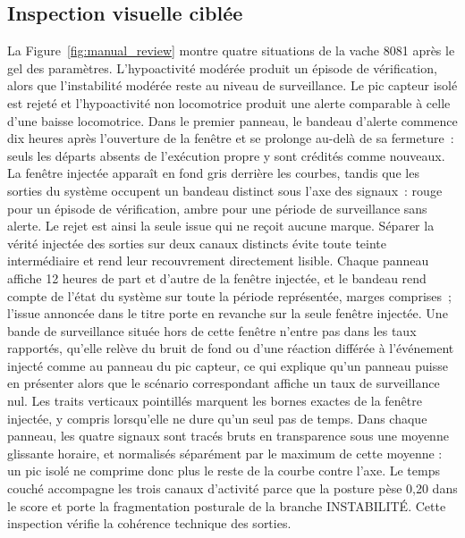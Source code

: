 \subsection{Inspection visuelle ciblée}
La Figure~\ref{fig:manual_review} montre quatre situations de la vache 8081 après le gel
des paramètres. L'hypoactivité modérée produit un épisode de vérification, alors que
l'instabilité modérée reste au niveau de surveillance. Le pic capteur isolé est rejeté et
l'hypoactivité non
locomotrice produit une alerte comparable à celle d'une baisse locomotrice. Dans le premier
panneau, le bandeau d'alerte commence dix heures après l'ouverture de la fenêtre et se
prolonge au-delà de sa fermeture~: seuls les départs absents de l'exécution propre y sont
crédités comme nouveaux. La fenêtre injectée
apparaît en fond gris derrière les courbes, tandis que les sorties du système occupent un
bandeau distinct sous l'axe des signaux~: rouge pour un épisode de vérification, ambre pour une
période de surveillance sans alerte. Le rejet est ainsi la seule issue qui ne reçoit aucune
marque. Séparer la vérité injectée des sorties sur deux canaux distincts évite toute teinte
intermédiaire et rend leur recouvrement directement lisible. Chaque panneau affiche 12
heures de part et d'autre de la fenêtre injectée, et le bandeau rend compte de l'état du
système sur toute la période représentée, marges comprises~; l'issue annoncée dans le titre
porte en revanche sur la seule fenêtre injectée. Une bande de surveillance située hors de
cette fenêtre n'entre pas dans les taux rapportés, qu'elle relève du bruit de fond ou d'une
réaction différée à l'événement injecté comme au panneau du pic capteur, ce qui
explique qu'un panneau puisse en présenter alors que le scénario correspondant affiche un
taux de surveillance nul. Les traits verticaux pointillés
marquent les bornes exactes de la fenêtre injectée, y compris lorsqu'elle ne dure qu'un seul
pas de temps. Dans chaque panneau, les quatre
signaux sont tracés bruts en transparence sous une moyenne glissante horaire, et normalisés
séparément par le maximum de cette moyenne : un pic isolé ne comprime donc plus le reste de la
courbe contre l'axe. Le temps couché accompagne les trois canaux d'activité parce que la
posture pèse 0,20 dans le score et porte la fragmentation posturale de la branche
INSTABILITÉ. Cette inspection vérifie la cohérence technique des sorties.

